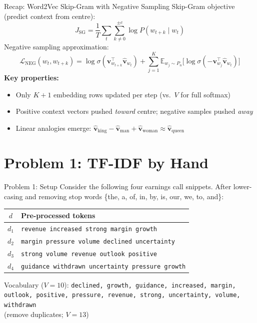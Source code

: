 \documentclass[9pt,t]{beamer}
\begin{document}
\begin{frame}{Recap: Word2Vec Skip-Gram with Negative Sampling}
  Skip-Gram objective (predict context from centre):
  \[
    J_{\mathrm{SG}} = \frac{1}{T}\sum_{t}\sum_{k \neq 0}^{\pm c}
    \log P(w_{t+k} \mid w_t)
  \]
  Negative sampling approximation:
  \[
    \mathcal{L}_{\mathrm{NEG}}(w_t, w_{t+k})
    = \log \sigma(\mathbf{v}_{w_{t+k}}^\top \hat{\mathbf{v}}_{w_t})
    + \sum_{j=1}^{K} \mathbb{E}_{w_j \sim P_n}
      \bigl[\log \sigma(-\mathbf{v}_{w_j}^\top \hat{\mathbf{v}}_{w_t})\bigr]
  \]
  \medskip
  \textbf{Key properties:}
  \begin{itemize}
    \item Only $K{+}1$ embedding rows updated per step (vs.\ $V$ for full softmax)
    \item Positive context vectors pushed \emph{toward} centre; negative samples pushed \emph{away}
    \item Linear analogies emerge: $\hat{\mathbf{v}}_{\text{king}} - \hat{\mathbf{v}}_{\text{man}}
          + \hat{\mathbf{v}}_{\text{woman}} \approx \hat{\mathbf{v}}_{\text{queen}}$
  \end{itemize}
\end{frame}

\section{Problem 1: TF-IDF by Hand}

\begin{frame}{Problem 1: Setup}
  Consider the following four earnings call snippets.
  After lower-casing and removing stop words \{the, a, of, in, by, is, our, we, to, and\}:
  \medskip
  \begin{center}
  \begin{tabular}{@{}cl@{}}
    \toprule
    $d$ & Pre-processed tokens \\
    \midrule
    $d_1$ & \texttt{revenue increased strong margin growth} \\
    $d_2$ & \texttt{margin pressure volume declined uncertainty} \\
    $d_3$ & \texttt{strong volume revenue outlook positive} \\
    $d_4$ & \texttt{guidance withdrawn uncertainty pressure growth} \\
    \bottomrule
  \end{tabular}
  \end{center}
  \medskip
  Vocabulary ($V = 10$): \texttt{declined, growth, guidance, increased, margin, outlook,
  positive, pressure, revenue, strong, uncertainty, volume, withdrawn}\\
  (remove duplicates; $V = 13$)
\end{frame}
\end{document}
